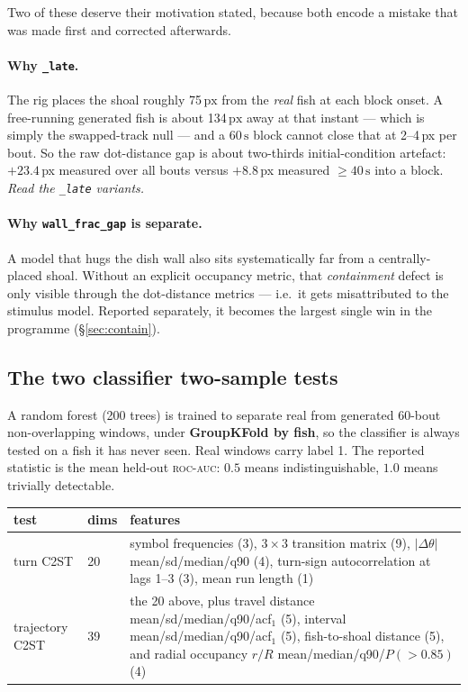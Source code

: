 \documentclass[11pt,a4paper]{article}
\newcommand{\uu}[1]{\ensuremath{\,\mathrm{#1}}}  %
\newcommand{\dth}{\ensuremath{\Delta\theta}}
\newcommand{\ctst}{C2ST}
\newcommand{\code}[1]{\texttt{\small #1}}
\begin{document}
Two of these deserve their motivation stated, because both encode a mistake that was
made first and corrected afterwards.

\paragraph{Why \code{\_late}.} The rig places the shoal roughly 75\uu{px} from the
\emph{real} fish at each block onset. A free-running generated fish is about
134\uu{px} away at that instant --- which is simply the swapped-track null --- and a
60\uu{s} block cannot close that at 2--4\,px per bout. So the raw dot-distance
gap is about two-thirds initial-condition artefact: $+23.4$\,px measured over all bouts
versus $+8.8$\,px measured $\geq40\uu{s}$ into a block. \emph{Read the
\code{\_late} variants.}

\paragraph{Why \code{wall\_frac\_gap} is separate.} A model that hugs the dish wall also
sits systematically far from a centrally-placed shoal. Without an explicit occupancy
metric, that \emph{containment} defect is only visible through the dot-distance
metrics --- i.e.\ it gets misattributed to the stimulus model. Reported separately,
it becomes the largest single win in the programme (\S\ref{sec:contain}).

\subsection{The two classifier two-sample tests}\label{sec:c2st}

A random forest (200 trees) is trained to separate real from generated 60-bout
non-overlapping windows, under \textbf{GroupKFold by fish}, so the classifier is always
tested on a fish it has never seen. Real windows carry label 1. The reported statistic is
the mean held-out \textsc{roc-auc}: $0.5$ means indistinguishable, $1.0$ means trivially
detectable.

\begin{center}\small
\begin{tabular}{p{}p{}p{}}
\toprule
\textbf{test} & \textbf{dims} & \textbf{features} \\
\midrule
turn \ctst{} & 20 &
  symbol frequencies (3), $3\times3$ transition matrix (9), $|\dth|$ mean/sd/median/q90 (4),
  turn-sign autocorrelation at lags 1--3 (3), mean run length (1) \\
\addlinespace
trajectory \ctst{} & 39 &
  the 20 above, plus travel distance mean/sd/median/q90/acf$_1$ (5), interval
  mean/sd/median/q90/acf$_1$ (5), fish-to-shoal distance (5), and radial occupancy
  $r/R$ mean/median/q90/$P(>0.85)$ (4) \\
\bottomrule
\end{tabular}
\end{center}
\end{document}

